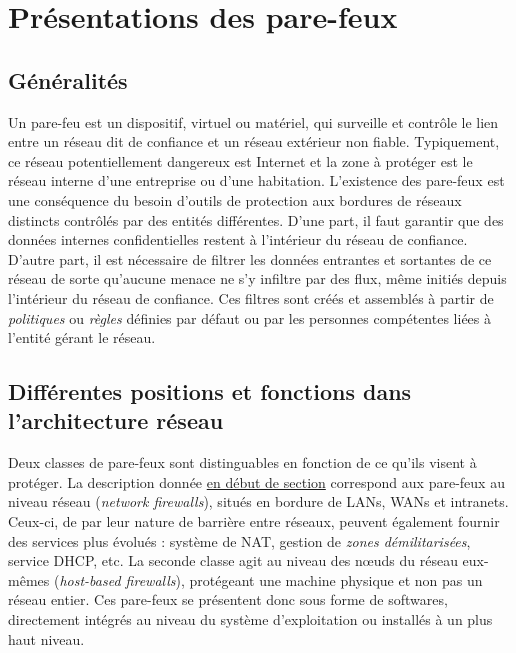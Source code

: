 \documentclass[]{article}
\begin{document}
\newpage


\section{Présentations des pare-feux}

\subsection{Généralités}\label{gen_FW}

Un pare-feu est un dispositif, virtuel ou matériel, qui surveille et contrôle le lien entre un réseau dit de confiance et un réseau extérieur non fiable. Typiquement, ce réseau potentiellement dangereux est Internet et la zone à protéger est le réseau interne d'une entreprise ou d'une habitation. L'existence des pare-feux est une conséquence du besoin d'outils de protection aux bordures de réseaux distincts contrôlés par des entités différentes. D'une part, il faut garantir que des données internes confidentielles restent à l'intérieur du réseau de confiance. D'autre part, il est nécessaire de filtrer les données entrantes et sortantes de ce réseau de sorte qu'aucune menace ne s'y infiltre par des flux, même initiés depuis l'intérieur du réseau de confiance. Ces filtres sont créés et assemblés à partir de \textit{politiques} ou \textit{règles} définies par défaut ou par les personnes compétentes liées à l'entité gérant le réseau.

\subsection{Différentes positions et fonctions dans l'architecture réseau}

\par Deux classes de pare-feux sont distinguables en fonction de ce qu'ils visent à protéger. La description donnée \hyperref[gen_FW]{en début de section} correspond aux pare-feux au niveau réseau (\textit{network firewalls}), situés en bordure de LANs, WANs et intranets. Ceux-ci, de par leur nature de barrière entre réseaux, peuvent également fournir des services plus évolués : système de NAT, gestion de \textit{zones démilitarisées}, service DHCP, etc. \cite{Shimonski2013} La seconde classe agit au niveau des nœuds du réseau eux-mêmes (\textit{host-based firewalls}), protégeant une machine physique et non pas un réseau entier. Ces pare-feux se présentent donc sous forme de softwares, directement intégrés au niveau du système d'exploitation ou installés à un plus haut niveau.\\
\end{document}
